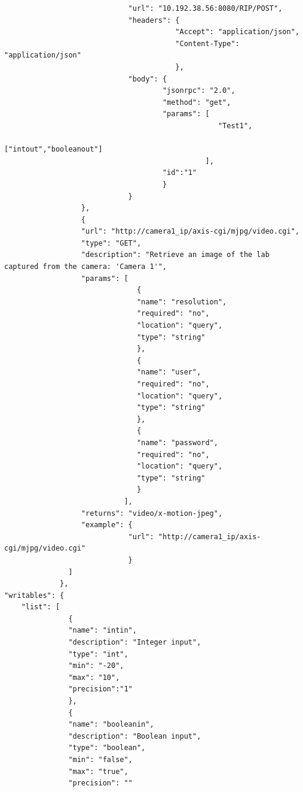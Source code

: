 \begin{lstlisting}
                             "url": "10.192.38.56:8080/RIP/POST",
                             "headers": {
                                        "Accept": "application/json",
                                        "Content-Type": "application/json"
                                        },
                             "body": {
                                     "jsonrpc": "2.0",
                                     "method": "get",
                                     "params": [
                                                  "Test1",
                                                  ["intout","booleanout"]
                                               ],
                                     "id":"1"
                                     }
                             }
                  },
                  {
                  "url": "http://camera1_ip/axis-cgi/mjpg/video.cgi",
                  "type": "GET",
                  "description": "Retrieve an image of the lab captured from the camera: 'Camera 1'",
                  "params": [
                               {
                               "name": "resolution",
                               "required": "no",
                               "location": "query",
                               "type": "string"
                               },
                               {
                               "name": "user",
                               "required": "no",
                               "location": "query",
                               "type": "string"
                               },
                               {
                               "name": "password",
                               "required": "no",
                               "location": "query",
                               "type": "string"
                               }
                            ],
                  "returns": "video/x-motion-jpeg",
                  "example": {
                             "url": "http://camera1_ip/axis-cgi/mjpg/video.cgi"
                             }
               ]
             },
"writables": {
    "list": [
               {
               "name": "intin",
               "description": "Integer input",
               "type": "int",
               "min": "-20",
               "max": "10",
               "precision":"1"
               },
               {
               "name": "booleanin",
               "description": "Boolean input",
               "type": "boolean",
               "min": "false",
               "max": "true",
               "precision": ""

\end{lstlisting}

